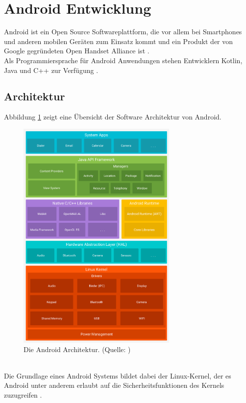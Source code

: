 \section{Android Entwicklung}
Android ist ein Open Source Softwareplattform, die vor allem bei Smartphones und anderen mobilen Geräten zum Einsatz kommt und ein Produkt der von Google gegründeten Open Handset Alliance ist \citep[S. 4]{gargenta:learning-android}. \\
Als Programmiersprache für Android Anwendungen stehen Entwicklern Kotlin, Java und C++ zur Verfügung \citep{android:fundamentals}.

\subsection{Architektur}
Abbildung \ref{fig:android-stack} zeigt eine Übersicht der Software Architektur von Android. 
\begin{figure}[h!]
\centering
\includegraphics[width=0.7\textwidth]{Abbildungen/android-stack.png}
\caption[Android Architektur]{Die Android Architektur. (Quelle: \citet{android:architecture})}
\label{fig:android-stack}
\end{figure}\\
Die Grundlage eines Android Systems bildet dabei der Linux-Kernel, der es Android unter anderem erlaubt auf die Sicherheitsfunktionen des Kernels zuzugreifen \citep{android:architecture}. \\
